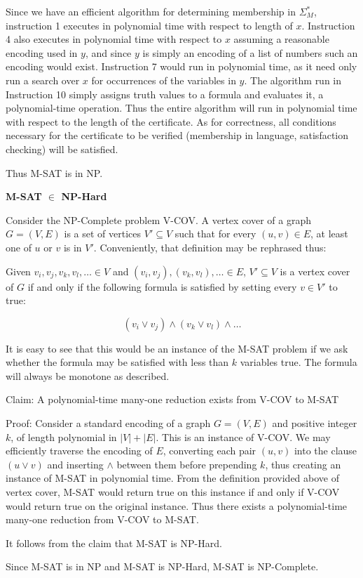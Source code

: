 \documentclass{article}
\begin{document}
Since we have an efficient algorithm for determining membership in $\Sigma ^\ast _M$, instruction 1 executes in polynomial time with respect to length of $x$. Instruction 4 also executes in polynomial time with respect to $x$ assuming a reasonable encoding used in $y$, and since $y$ is simply an encoding of a list of numbers such an encoding would exist. Instruction 7 would run in polynomial time, as it need only run a search over $x$ for occurrences of the variables in $y$. The algorithm run in Instruction 10 simply assigns truth values to a formula and evaluates it, a polynomial-time operation. Thus the entire algorithm will run in polynomial time with respect to the length of the certificate. As for correctness, all conditions necessary for the certificate to be verified (membership in language, satisfaction checking) will be satisfied.

Thus M-SAT is in NP.

\textbf{M-SAT $\in$ NP-Hard}

Consider the NP-Complete problem V-COV. A vertex cover of a graph $G = (V,E)$ is a set of vertices $V' \subseteq V$ such that for every $(u,v) \in E$, at least one of $u$ or $v$ is in $V'$. Conveniently, that definition may be rephrased thus:

Given $v_i, v_j, v_k, v_l, \ldots \in V$ and $(v_i, v_j), (v_k, v_l), \ldots \in E$, $V' \subseteq V$ is a vertex cover of $G$ if and only if the following formula is satisfied by setting every $v \in V'$ to true:

\begin{equation*}
(v_i \vee v_j) \wedge (v_k \vee v_l) \wedge \ldots
\end{equation*}

It is easy to see that this would be an instance of the M-SAT problem if we ask whether the formula may be satisfied with less than $k$ variables true. The formula will always be monotone as described.

Claim: A polynomial-time many-one reduction exists from V-COV to M-SAT

Proof: Consider a standard encoding of a graph $G = (V,E)$ and positive integer $k$, of length polynomial in $|V| + |E|$. This is an instance of V-COV. We may efficiently traverse the encoding of $E$, converting each pair $(u,v)$ into the clause $(u \vee v)$ and inserting $\wedge$ between them before prepending $k$, thus creating an instance of M-SAT in polynomial time. From the definition provided above of vertex cover, M-SAT would return true on this instance if and only if V-COV would return true on the original instance. Thus there exists a polynomial-time many-one reduction from V-COV to M-SAT.

It follows from the claim that M-SAT is NP-Hard.

Since M-SAT is in NP and M-SAT is NP-Hard, M-SAT is NP-Complete.
\end{document}
